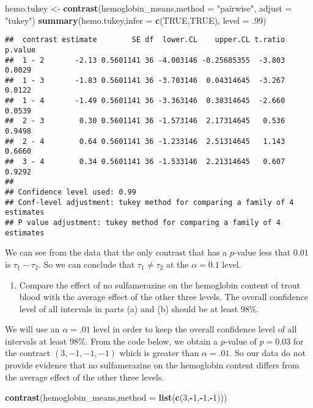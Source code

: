 \documentclass[12pt,]{article}
\newenvironment{Shaded}{\begin{snugshade}}{\end{snugshade}}
\newcommand{\KeywordTok}[1]{\textcolor[rgb]{0.13,0.29,0.53}{\textbf{#1}}}
\newcommand{\DataTypeTok}[1]{\textcolor[rgb]{0.13,0.29,0.53}{#1}}
\newcommand{\DecValTok}[1]{\textcolor[rgb]{0.00,0.00,0.81}{#1}}
\newcommand{\StringTok}[1]{\textcolor[rgb]{0.31,0.60,0.02}{#1}}
\newcommand{\OtherTok}[1]{\textcolor[rgb]{0.56,0.35,0.01}{#1}}
\newcommand{\OperatorTok}[1]{\textcolor[rgb]{0.81,0.36,0.00}{\textbf{#1}}}
\newcommand{\NormalTok}[1]{#1}
\providecommand{\tightlist}{%
  \setlength{\itemsep}{0pt}\setlength{\parskip}{0pt}}
\begin{document}
\begin{Shaded}
\begin{Highlighting}[]
\NormalTok{hemo.tukey <-}\StringTok{ }\KeywordTok{contrast}\NormalTok{(hemoglobin_means,}\DataTypeTok{method =} \StringTok{"pairwise"}\NormalTok{, }\DataTypeTok{adjust =} \StringTok{"tukey"}\NormalTok{)}
\KeywordTok{summary}\NormalTok{(hemo.tukey,}\DataTypeTok{infer =} \KeywordTok{c}\NormalTok{(}\OtherTok{TRUE}\NormalTok{,}\OtherTok{TRUE}\NormalTok{), }\DataTypeTok{level =}\NormalTok{ .}\DecValTok{99}\NormalTok{)}
\end{Highlighting}
\end{Shaded}

\begin{verbatim}
##  contrast estimate        SE df  lower.CL    upper.CL t.ratio p.value
##  1 - 2       -2.13 0.5601141 36 -4.003146 -0.25685355  -3.803  0.0029
##  1 - 3       -1.83 0.5601141 36 -3.703146  0.04314645  -3.267  0.0122
##  1 - 4       -1.49 0.5601141 36 -3.363146  0.38314645  -2.660  0.0539
##  2 - 3        0.30 0.5601141 36 -1.573146  2.17314645   0.536  0.9498
##  2 - 4        0.64 0.5601141 36 -1.233146  2.51314645   1.143  0.6660
##  3 - 4        0.34 0.5601141 36 -1.533146  2.21314645   0.607  0.9292
## 
## Confidence level used: 0.99 
## Conf-level adjustment: tukey method for comparing a family of 4 estimates 
## P value adjustment: tukey method for comparing a family of 4 estimates
\end{verbatim}

We can see from the data that the only contrast that has a \(p\)-value
less that \(0.01\) is \(\tau_1-\tau_2\). So we can conclude that
\(\tau_1 \neq \tau_2\) at the \(\alpha=0.1\) level.

\begin{enumerate}
\def\labelenumi{(\alph{enumi})}
\setcounter{enumi}{1}
\tightlist
\item
  Compare the effect of no sulfamerazine on the hemoglobin content of
  trout blood with the average effect of the other three levels. The
  overall confidence level of all intervals in parts (a) and (b) should
  be at least 98\%.
\end{enumerate}

We will use an \(\alpha = .01\) level in order to keep the overall
confidence level of all intervals at least 98\%. From the code below, we
obtain a \(p\)-value of \(p=0.03\) for the contract \((3,-1,-1,-1)\)
which is greater than \(\alpha=.01\). So our data do not provide
evidence that no sulfamerazine on the hemoglobin content differs from
the average effect of the other three levels.

\begin{Shaded}
\begin{Highlighting}[]
\KeywordTok{contrast}\NormalTok{(hemoglobin_means,}\DataTypeTok{method =} \KeywordTok{list}\NormalTok{(}\KeywordTok{c}\NormalTok{(}\DecValTok{3}\NormalTok{,}\OperatorTok{-}\DecValTok{1}\NormalTok{,}\OperatorTok{-}\DecValTok{1}\NormalTok{,}\OperatorTok{-}\DecValTok{1}\NormalTok{)))}
\end{Highlighting}
\end{Shaded}
\end{document}
